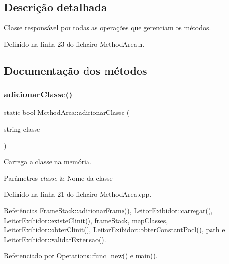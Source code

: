 \subsection{Descrição detalhada}
Classe responsável por todas as operações que gerenciam os métodos. 

Definido na linha 23 do ficheiro Method\+Area.\+h.



\subsection{Documentação dos métodos}
\mbox{\label{classMethodArea_a30233142aefa26c17a3a222582cb56c1}} 
\subsubsection{\texorpdfstring{adicionar\+Classe()}{adicionarClasse()}\hspace{0.1cm}{\footnotesize\ttfamily [1/2]}}
{\footnotesize\ttfamily static bool Method\+Area\+::adicionar\+Classe (\begin{DoxyParamCaption}\item[{string}]{classe }\end{DoxyParamCaption})\hspace{0.3cm}{\ttfamily [static]}}



Carrega a classe na memória. 


\begin{DoxyParams}{Parâmetros}
{\em classe} & Nome da classe \\
\hline
\end{DoxyParams}


Definido na linha 21 do ficheiro Method\+Area.\+cpp.



Referências Frame\+Stack\+::adicionar\+Frame(), Leitor\+Exibidor\+::carregar(), Leitor\+Exibidor\+::existe\+Clinit(), frame\+Stack, map\+Classes, Leitor\+Exibidor\+::obter\+Clinit(), Leitor\+Exibidor\+::obter\+Constant\+Pool(), path e Leitor\+Exibidor\+::validar\+Extensao().



Referenciado por Operations\+::func\+\_\+new() e main().

